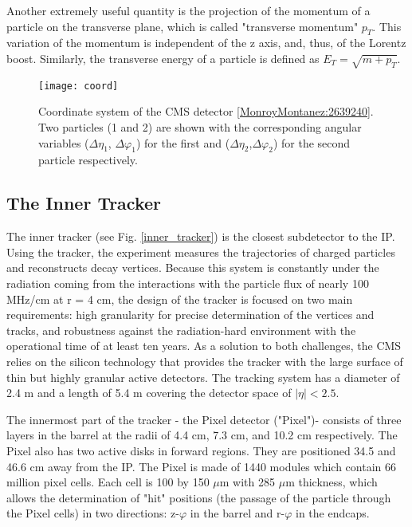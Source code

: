\begin{normalsize}
Another extremely useful quantity is the projection of the momentum of a particle on the transverse plane, which is called "transverse momentum" $p_T$. This variation of the momentum is independent of the z axis, and, thus, of the Lorentz boost.  Similarly, the transverse energy of a particle is defined as $E_T = \sqrt{m + p_T }$. 





\begin{figure}[H]
  \centering
  \texttt{[image: coord]}
  \caption[Coordinate system of the CMS detector]{Coordinate system of the CMS detector \ref{MonroyMontanez:2639240}. Two particles (1 and 2) are shown with the corresponding angular variables ($\Delta \eta_1$, $\Delta \varphi_1$) for the first and ($\Delta \eta_2$,$ \Delta \varphi_2$) for the second particle respectively.}
  \label{coord}
\end{figure}


\subsection{The Inner Tracker}

The inner tracker \cite{Tracker_phase2} (see Fig. \ref{inner_tracker}) is the closest subdetector to the IP. Using the tracker, the experiment measures the trajectories of charged particles and reconstructs decay vertices. Because this system is constantly under the radiation coming from the interactions with the particle flux of nearly 100 MHz/cm at r = 4 cm, the design of the tracker is focused on two main requirements: high granularity for precise determination of the vertices and tracks, and robustness against the radiation-hard environment with the operational time of at least ten years. As a solution to both challenges, the CMS relies on the silicon technology that provides the tracker with the large surface of thin but highly granular active detectors. The tracking system has a diameter of 2.4 m and a length of 5.4 m covering the detector space of $|\eta|< 2.5$. 

The innermost part of the tracker - the Pixel detector ("Pixel")- consists of three layers in the barrel at the radii of 4.4 cm, 7.3 cm, and 10.2 cm respectively. The Pixel also has two active disks in forward regions. They are positioned 34.5 and 46.6 cm away from the IP. The Pixel is made of 1440 modules which contain 66 million pixel cells. Each cell is 100 by 150 $\mu$m with 285 $\mu$m thickness, which allows the determination of "hit" positions (the passage of the particle through the Pixel cells) in two directions: z-$\varphi$ in the barrel and r-$\varphi$ in the endcaps.


\end{normalsize}
